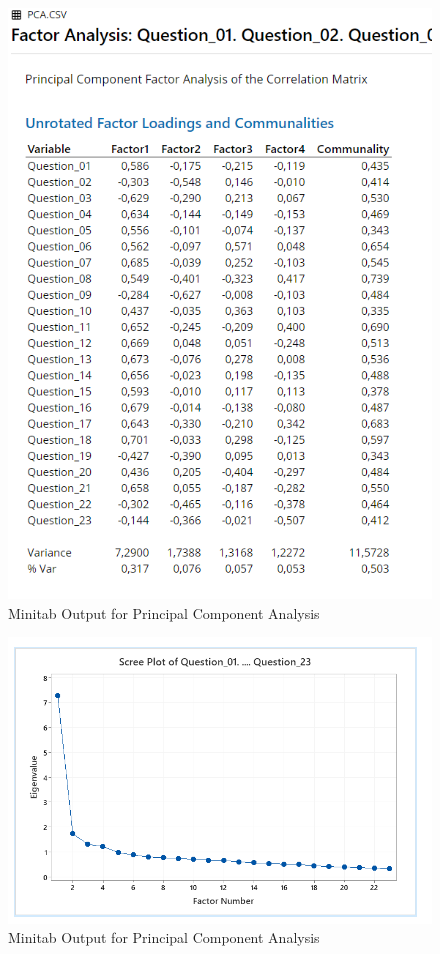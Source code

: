 \documentclass[
]{book}
\begin{document}
\begin{figure}[!h]
\includegraphics{Screenshots/Principal Component Analysis/pcaMinitab2} \caption{\label{fig:pcaMinitab}Minitab Output for Principal Component Analysis}\label{fig:pcaMinitab2}
\end{figure}

\begin{figure}[!h]
\includegraphics{Screenshots/Principal Component Analysis/pcaMinitab3} \caption{\label{fig:pcaMinitab}Minitab Output for Principal Component Analysis}\label{fig:pcaMinitab3}
\end{figure}
\end{document}
